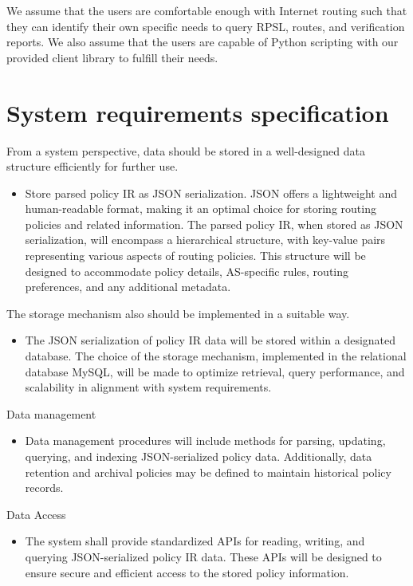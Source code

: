 \documentclass[12pt]{article}
\begin{document}


We assume that the users are comfortable enough with Internet routing
such that they can identify their own specific needs to
query RPSL, routes, and verification reports.
We also assume that the users are capable of Python scripting with
our provided client library to fulfill their needs.

\section{System requirements specification}
From a system perspective, data should be stored in a well-designed data structure efficiently for further use.
\begin{itemize}
    \item Store parsed policy IR as JSON serialization.
    JSON offers a lightweight and human-readable format, making it an optimal choice for storing routing policies and related information.
    The parsed policy IR, when stored as JSON serialization, will encompass a hierarchical structure, with key-value pairs representing various aspects of routing policies. This structure will be designed to accommodate policy details, AS-specific rules, routing preferences, and any additional metadata.
\end{itemize}
The storage mechanism also should be implemented in a suitable way.
\begin{itemize}
    \item The JSON serialization of policy IR data will be stored within a designated database. The choice of the storage mechanism, implemented in the relational database MySQL, will be made to optimize retrieval, query performance, and scalability in alignment with system requirements.
\end{itemize}
Data management 
\begin{itemize}
    \item Data management procedures will include methods for parsing, updating, querying, and indexing JSON-serialized policy data. Additionally, data retention and archival policies may be defined to maintain historical policy records.
\end{itemize}
Data Access
\begin{itemize}
    \item The system shall provide standardized APIs for reading, writing, and querying JSON-serialized policy IR data. These APIs will be designed to ensure secure and efficient access to the stored policy information.
\end{itemize}
\end{document}
